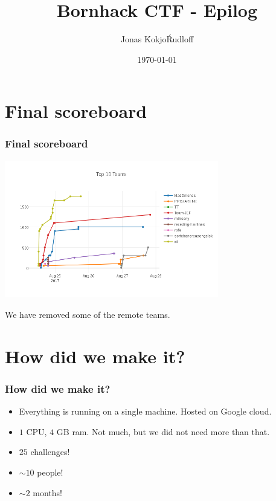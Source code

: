 \documentclass{beamer}
\begin{document}
\title{Bornhack CTF - Epilog}

\author{Jonas \'Kokjo\' Rudloff}
\date{\today} 


\frame{\frametitle{}\tableofcontents} 

\section{Final scoreboard}
\begin{frame}
    \frametitle{Final scoreboard}

    \includegraphics[height=6cm]{scoreboard.png}

    We have removed some of the remote teams.
\end{frame}

\begin{frame}
\end{frame}

\section{How did we make it?}
\begin{frame}
    \frametitle{How did we make it?}
    \begin{itemize}
        \item Everything is running on a single machine. Hosted on Google cloud.
        \item $1$ CPU, $4$ GB ram. Not much, but we did not need more than that.
        \item $25$ challenges!
        \item $\sim 10$ people!
        \item $\sim 2$ months!
    \end{itemize}
\end{frame}
\end{document}
